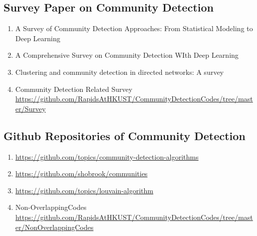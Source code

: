 \documentclass{article}
\begin{document}
\subsection{Survey Paper on Community Detection}
\begin{enumerate}
    \item A Survey of Community Detection Approaches: From Statistical Modeling to Deep Learning \cite{jin2021survey}
    \item A Comprehensive Survey on Community Detection WIth Deep Learning \cite{su2022comprehensive}
    \item Clustering and community detection in directed networks: A survey \cite{malliaros2013clustering}
    \item Community Detection Related Survey \url{https://github.com/RapidsAtHKUST/CommunityDetectionCodes/tree/master/Survey}
 \end{enumerate}  

\subsection{Github Repositories of Community Detection}
\begin{enumerate}
    \item \url{https://github.com/topics/community-detection-algorithms}
    \item \url{https://github.com/shobrook/communities}
    \item \url{https://github.com/topics/louvain-algorithm}
    \item Non-OverlappingCodes \url{https://github.com/RapidsAtHKUST/CommunityDetectionCodes/tree/master/NonOverlappingCodes}
 \end{enumerate}  



% 


\end{document}
